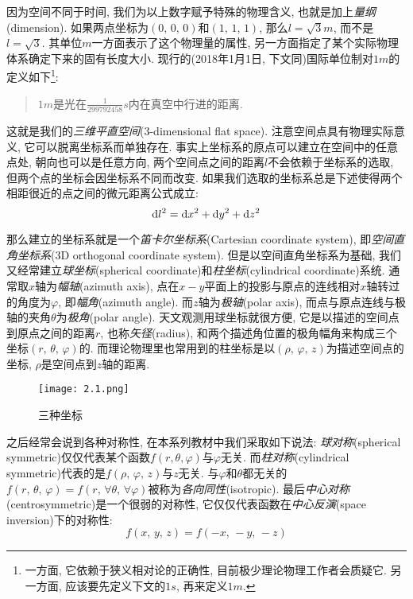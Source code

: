 因为空间不同于时间, 我们为以上数字赋予特殊的物理含义, 也就是加上\emph{量纲}(dimension). 如果两点坐标为$(0,\,0,\,0)$和$(1,\,1,\,1)$, 那么$l= \si{\sqrt{3}m}$, 而不是$l=\sqrt{3}$. 其单位$\si{m}$一方面表示了这个物理量的属性, 另一方面指定了某个实际物理体系确定下来的固有长度大小. 现行的(2018年1月1日, 下文同)国际单位制对$\si{1m}$的定义如下\footnote{一方面, 它依赖于狭义相对论的正确性, 目前极少理论物理工作者会质疑它. 另一方面, 应该要先定义下文的$\si{1s}$, 再来定义$\si{1m}$.}:
\begin{verse}\sf\large
$\si{1m}$是光在$\si{\frac{1}{299792458}s}$内在真空中行进的距离.
\end{verse}


这就是我们的\emph{三维平直空间}(3-dimensional flat space). 注意空间点具有物理实际意义, 它可以脱离坐标系而单独存在. 事实上坐标系的原点可以建立在空间中的任意点处, 朝向也可以是任意方向, 两个空间点之间的距离$l$不会依赖于坐标系的选取, 但两个点的坐标会因坐标系不同而改变. 如果我们选取的坐标系总是下述使得两个相距很近的点之间的微元距离公式成立:
\[\textrm{d} l^2=\textrm{d} x^2+\textrm{d} y^2+\textrm{d} z^2\]


那么建立的坐标系就是一个\emph{笛卡尔坐标系}(Cartesian coordinate system), 即\emph{空间直角坐标系}(3D orthogonal coordinate system). 但是以空间直角坐标系为基础, 我们又经常建立\emph{球坐标}(spherical coordinate)和\emph{柱坐标}(cylindrical coordinate)系统. 通常取$x$轴为\emph{幅轴}(azimuth axis), 点在$x-y$平面上的投影与原点的连线相对$x$轴转过的角度为$\varphi$, 即\emph{幅角}(azimuth angle). 而$z$轴为\emph{极轴}(polar axis), 而点与原点连线与极轴的夹角$\theta$为\emph{极角}(polar angle). 天文观测用球坐标就很方便, 它是以描述的空间点到原点之间的距离$r$, 也称\emph{矢径}(radius), 和两个描述角位置的极角幅角来构成三个坐标$(r,\,\theta,\,\varphi)$的. 而理论物理里也常用到的柱坐标是以$(\rho,\,\varphi,\,z)$为描述空间点的坐标, $\rho$是空间点到$z$轴的距离.

\begin{wrapfigure}[16]{o}[-10pt]{7cm}
\vspace{-0.4cm}
\centering
\texttt{[image: 2.1.png]}
\caption{三种坐标}
\end{wrapfigure}
之后经常会说到各种对称性, 在本系列教材中我们采取如下说法: \emph{球对称}(spherical symmetric)仅仅代表某个函数$f(r,\theta,\varphi)$与$\varphi$无关. 而\emph{柱对称}(cylindrical symmetric)代表的是$f(\rho,\,\varphi,\,z)$与$z$无关. 与$\varphi$和$\theta$都无关的$f(r,\,\theta,\,\varphi)=f(r,\,\forall\theta,\,\forall\varphi)$被称为\emph{各向同性}(isotropic). 最后\emph{中心对称}(centrosymmetric)是一个很弱的对称性, 它仅仅代表函数在\emph{中心反演}(space inversion)下的对称性:
\[f(x,\,y,\,z)=f(-x,\,-y,\,-z)\]

